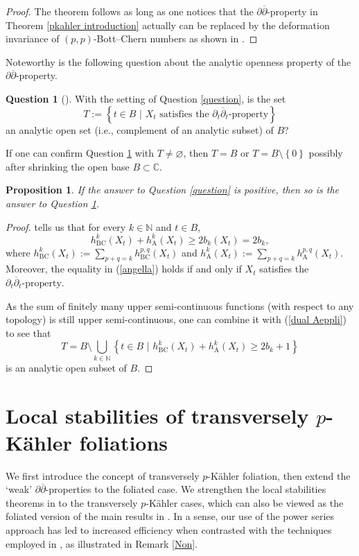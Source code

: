 \documentclass[12pt]{amsart}
\numberwithin{equation}{section}
\newtheorem{proposition}[theorem]{Proposition}
\theoremstyle{definition}
\newtheorem{question}  [theorem]     {Question}
\theoremstyle{definition}
\theoremstyle{definition}
\renewcommand{\1}{\mathsf{1}}
\newcommand{\beq}{\begin{equation}}
\newcommand{\eeq}{\end{equation}}
\renewcommand{\>}{\rightarrow}
\newcommand{\p}{\partial}
\newcommand{\bp}{\overline\partial}
\def\p{\partial}
\def\mb{\mathbb}
\theoremstyle{plain} %
\theoremstyle{plain} %
\theoremstyle{plain} %
\begin{document}
	\begin{proof}
		The theorem follows as long as one notices that the $\p\bp$-property in Theorem \ref{pkahler introduction}  actually can be replaced by the deformation invariance of $(p,p)$-Bott--Chern numbers as shown in \cite[Remark 4.13]{RWZ21}.
	\end{proof}
	
	Noteworthy is the following question about the analytic openness property of the $\p\bp$-property.
	
	\begin{question}[{\cite[p. 2]{Xi21a}}]\label{xia's question}
		With the setting of Question \ref{question}, is the set
		$$T:=\left\{t\in B \,\, |\,\, X_t \text{ satisfies the } \p_t{\bp}_t\text{-property}\right\}$$ an analytic open set (i.e., complement of an analytic subset) of $B$?
	\end{question}
	
	If one can confirm  Question  \ref{xia's question} with $T\neq\varnothing$,  then  $T=B$ or $T=B\setminus\left\{0\right\}$ possibly after shrinking the open base $B\subset\mb C$.
	\begin{proposition}
		If the answer to Question \ref{question} is positive, then so is the answer to Question \ref{xia's question}.
	\end{proposition}
	\begin{proof}
		\cite[Theorem]{AT13} tells us that for every $k\in\mb N$ and $t\in B$,
		\beq \label{angella}h_{\mathrm {BC}}^k(X_t)+h_\mathrm{A}^k(X_t)\ge2b_k(X_t)=2b_k,\eeq
		where $h_{\mathrm {BC}}^k(X_t):=\sum_{p+q=k}h^{p,q}_{\mathrm {BC}}(X_t)$ and $h_{\mathrm{A}}^k(X_t):=\sum_{p+q=k}h^{p,q}_{\mathrm{A}}(X_t).$
		Moreover, the equality in (\ref{angella}) holds if and only if $X_t$ satisfies the $\p_t{\bp}_t\text{-property}.$
		
		As the sum of finitely many upper semi-continuous functions (with respect to any topology) is still upper semi-continuous, one can combine it with (\ref{dual Aeppli}) to see that
		$$T=B\setminus\bigcup_{k\in \mb N }\left\{t\in B \,\, |\,\, h_{\mathrm {BC}}^k(X_t)+h_\mathrm{A}^k(X_t)\ge2b_k+1\right\}$$
		is an analytic open subset of $B$.
	\end{proof}
	
	
	
		\section{Local stabilities of transversely \texorpdfstring{$p$}{p}-K\"ahler foliations}\label{LOCAL}
	We first introduce the concept of transversely $p$-K\"ahler foliation,
	then extend the `weak' $\partial\bp$-properties to the foliated case.   We strengthen  the local stabilities theorems in \cite{EKAG97, Ra21} to the transversely $p$-K\"ahler cases, which can also be viewed as the foliated version of the main results in \cite{RWZ19}.  In a sense, our use of the power series approach has led to increased efficiency when contrasted with the techniques employed in \cite{EKAG97,Ra21}, as illustrated in Remark \ref{Non}.
	
\end{document}
